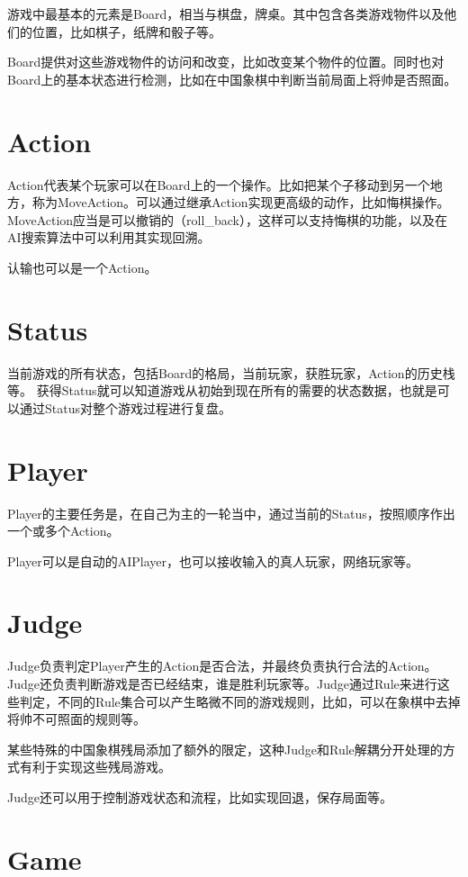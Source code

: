 \documentclass[export, 12pt, letterpaper]{ctexrep}
\begin{document}
游戏中最基本的元素是Board，相当与棋盘，牌桌。其中包含各类游戏物件以及他们的位置，比如棋子，纸牌和骰子等。

Board提供对这些游戏物件的访问和改变，比如改变某个物件的位置。同时也对Board上的基本状态进行检测，比如在中国象棋中判断当前局面上将帅是否照面。

\section{Action}

Action代表某个玩家可以在Board上的一个操作。比如把某个子移动到另一个地方，称为MoveAction。可以通过继承Action实现更高级的动作，比如悔棋操作。MoveAction应当是可以撤销的（roll\_back），这样可以支持悔棋的功能，以及在AI搜索算法中可以利用其实现回溯。

认输也可以是一个Action。

\section{Status}

当前游戏的所有状态，包括Board的格局，当前玩家，获胜玩家，Action的历史栈等。
获得Status就可以知道游戏从初始到现在所有的需要的状态数据，也就是可以通过Status对整个游戏过程进行复盘。

\section{Player}

Player的主要任务是，在自己为主的一轮当中，通过当前的Status，按照顺序作出一个或多个Action。

Player可以是自动的AIPlayer，也可以接收输入的真人玩家，网络玩家等。

\section{Judge}

Judge负责判定Player产生的Action是否合法，并最终负责执行合法的Action。Judge还负责判断游戏是否已经结束，谁是胜利玩家等。Judge通过Rule来进行这些判定，不同的Rule集合可以产生略微不同的游戏规则，比如，可以在象棋中去掉将帅不可照面的规则等。

某些特殊的中国象棋残局添加了额外的限定，这种Judge和Rule解耦分开处理的方式有利于实现这些残局游戏。

Judge还可以用于控制游戏状态和流程，比如实现回退，保存局面等。

\section{Game}
\end{document}
